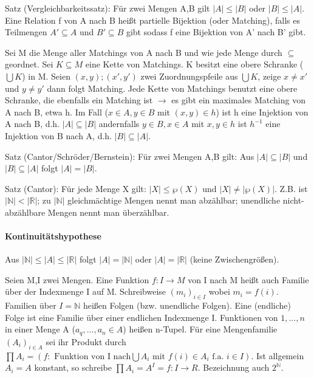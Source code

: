 \documentclass[a4paper]{article}
\begin{document}
\begin{multicols}{3}
    Satz (Vergleichbarkeitssatz):
    Für zwei Mengen A,B gilt $|A|\leq |B|$ oder $|B| \leq |A|$. Eine Relation f von A nach B heißt partielle Bijektion (oder Matching), falls es Teilmengen $A'\subseteq A$ und $B'\subseteq B$ gibt sodass f eine Bijektion von A' nach B' gibt.
    
    Sei M die Menge aller Matchings von A nach B und wie jede Menge durch $\subseteq$ geordnet. Sei $K\subseteq M$ eine Kette von Matchings. K besitzt eine obere Schranke ($\bigcup K$) in M. Seien $(x,y);(x',y')$ zwei Zuordnungspfeile aus $\bigcup K$, zeige $x\not = x'$ und $y\not = y'$ dann folgt Matching.
    Jede Kette von Matchings benutzt eine obere Schranke, die ebenfalls ein Matching ist $\rightarrow$ es gibt ein maximales Matching von A nach B, etwa h. Im Fall ($x\in A, y\in B$ mit $(x,y)\in h$) ist h eine Injektion von A nach B, d.h. $|A| \subseteq |B|$ andernfalls $y\in B, x\in A$ mit $x,y\in h$ ist $h^{-1}$ eine Injektion von B nach A, d.h. $|B| \subseteq |A|$.
    
    Satz (Cantor/Schröder/Bernstein): 
    Für zwei Mengen A,B gilt: Aus $|A|\subseteq |B|$ und $|B| \subseteq |A|$ folgt $|A| = |B|$.
    
    Satz (Cantor):
    Für jede Menge X gilt: $|X| \leq \wp(X)$ und $|X|\not= |\wp (X)|$. Z.B. ist $|\mathbb{N}|<|\mathbb{R}|$; zu $|\mathbb{N}|$ gleichmächtige Mengen nennt man abzählbar; unendliche nicht-abzählbare Mengen nennt man überzählbar.
    
    \paragraph{Kontinuitätshypothese}
    Aus $|\mathbb{N}|\leq |A| \leq |\mathbb{R}|$ folgt $|A|=|\mathbb{N}|$ oder $|A|=|\mathbb{R}|$ (keine Zwischengrößen).
    
    Seien M,I zwei Mengen. Eine Funktion $f:I\rightarrow M$ von I nach M heißt auch Familie über der Indexmenge I auf M. Schreibweise $(m_i)_{i\in I}$ wobei $m_i=f(i)$. Familien über $I=\mathbb{N}$ heißen Folgen (bzw. unendliche Folgen).
    Eine (endliche) Folge ist eine Familie über einer endlichen Indexmenge I. Funktionen von ${1,...,n}$ in einer Menge A ($a_q,...,a_n\in A$) heißen n-Tupel. Für eine Mengenfamilie $(A_i)_{i\in A}$ sei ihr Produkt durch $\prod A_i=(f: \text{ Funktion von I nach}\bigcup A_i \text{ mit } f(i)\in A_i \text{ f.a. } i\in I)$. Ist allgemein $A_i=A$ konstant, so schreibe $\prod A_i=A^I={f:I\rightarrow R}$. Bezeichnung auch $2^{\mathbb{N}}$.
    

\end{multicols}
\end{document}
